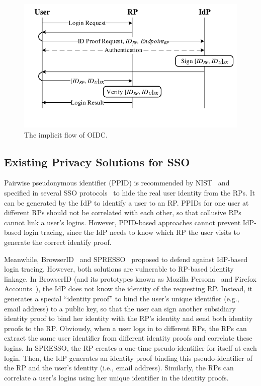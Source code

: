 \begin{figure}[t]
  \centering
  \includegraphics[width=0.9\linewidth]{fig/OIDC1.pdf}
  \caption{The implicit flow of OIDC.}
  \label{fig:OpenID}
  \vspace{-5mm}
\end{figure}

\subsection{Existing Privacy Solutions for SSO}
\label{subsec-solutions}
Pairwise pseudonymous identifier (PPID) is recommended by NIST~\cite{NIST2017draft} and specified in several SSO protocols~\cite{OpenIDConnect, SAMLIdentifier} to hide the real user identity from the RPs. It can be generated by the IdP to identify a user to an RP. PPIDs for one user at different RPs should not be correlated with each other, so that collusive RPs cannot link a user's logins. However, PPID-based approaches cannot prevent IdP-based login tracing, since the IdP needs to know which RP the user visits to generate the correct identify proof. 

Meanwhile, BrowserID~\cite{BrowserID} and SPRESSO~\cite{SPRESSO} proposed to defend against IdP-based login tracing. However, both solutions are vulnerable to RP-based identity linkage. In BrowserID (and its prototypes known as Mozilla Persona~\cite{persona} and Firefox Accounts~\cite{FirefoxAccount}), the IdP does not know the identity of the requesting RP. Instead, it generates a special ``identity proof'' to bind the user's unique identifier (e.g., email address) to a public key, so that the user can sign another subsidiary identity proof to bind her identity with the RP's identity and send both identity proofs to the RP. Obviously, when a user logs in to different RPs, the RPs can extract the same user identifier from different identity proofs and correlate these logins. In SPRESSO, the RP creates a one-time pseudo-identifier for itself at each login. Then, the IdP generates an identity proof binding this pseudo-identifier of the RP and the user's identity (i.e., email address). %
Similarly, the RPs can correlate a user's logins using her unique identifier in the identity proofs.

